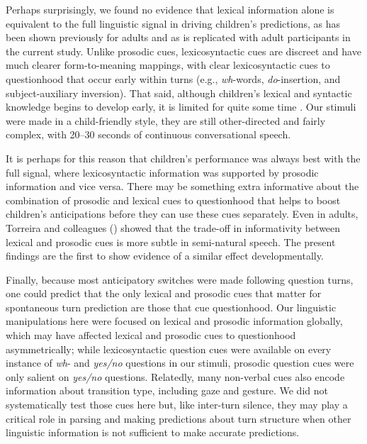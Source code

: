 \documentclass[authoryear, 12pt]{elsarticle}
\begin{document}
Perhaps surprisingly, we found no evidence that lexical information alone is equivalent to the full linguistic signal in driving children's predictions, as has been shown previously for adults \citep{magyari2012, de-ruiter2006} and as is replicated with adult participants in the current study. Unlike prosodic cues, lexicosyntactic cues are discreet and have much clearer form-to-meaning mappings, with clear lexicosyntactic cues to questionhood that occur early within turns (e.g., \textit{wh}-words, \textit{do}-insertion, and subject-auxiliary inversion). That said, although children's lexical and syntactic knowledge begins to develop early, it is limited for quite some time \citep{bergelson2013, shi2010, tomasello1999}. Our stimuli were made in a child-friendly style, they are still other-directed and fairly complex, with 20--30 seconds of continuous conversational speech.

It is perhaps for this reason that children's performance was always best with the full signal, where lexicosyntactic information was supported by prosodic information and vice versa. There may be something extra informative about the combination of prosodic and lexical cues to questionhood that helps to boost children's anticipations before they can use these cues separately. Even in adults, Torreira and colleagues (\citeyear{torreira2015}) showed that the trade-off in informativity between lexical and prosodic cues is more subtle in semi-natural speech. The present findings are the first to show evidence of a similar effect developmentally.

Finally, because most anticipatory switches were made following question turns, one could predict that the only lexical and prosodic cues that matter for spontaneous turn prediction are those that cue questionhood. Our linguistic manipulations here were focused on lexical and prosodic information globally, which may have affected lexical and prosodic cues to questionhood asymmetrically; while lexicosyntactic question cues were available on every instance of \textit{wh}- and \textit{yes/no} questions in our stimuli, prosodic question cues were only salient on \textit{yes/no} questions. Relatedly, many non-verbal cues also encode information about transition type, including gaze and gesture. We did not systematically test those cues here but, like inter-turn silence, they may play a critical role in parsing and making predictions about turn structure when other linguistic information is not sufficient to make accurate predictions.
\end{document}
